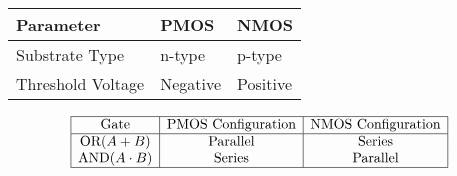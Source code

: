 \documentclass[8pt]{article}
\begin{document}
\begin{table}[h]
    \centering
    \begin{tabular}{|l|l|l|}
        \hline
        \textbf{Parameter} & \textbf{PMOS} & \textbf{NMOS} \\
        \hline
        Substrate Type & n-type & p-type \\
        Threshold Voltage & Negative & Positive \\
        \hline
    \end{tabular}
\end{table}

\[
\begin{array}{|c|c|c|}
\hline
\text{Gate} & \text{PMOS Configuration} & \text{NMOS Configuration} \\
\hline
\text{OR} (A + B) & \text{Parallel} & \text{Series} \\
\text{AND} (A \cdot B) & \text{Series} & \text{Parallel} \\
\hline
\end{array}
\]




\end{document}
